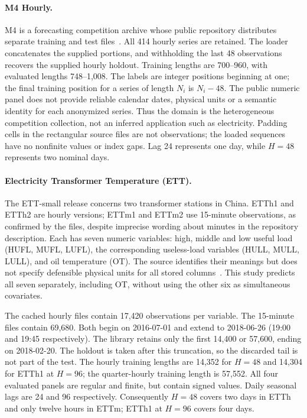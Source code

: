 

\paragraph{M4 Hourly.}
M4 is a forecasting competition archive whose public repository distributes separate training and test files~\cite{m4_data}. All 414 hourly series are retained. The loader concatenates the supplied portions, and withholding the last 48 observations recovers the supplied hourly holdout. Training lengths are 700--960, with evaluated lengths 748--1,008. The labels are integer positions beginning at one; the final training position for a series of length $N_i$ is $N_i-48$. The public numeric panel does not provide reliable calendar dates, physical units or a semantic identity for each anonymized series. Thus the domain is the heterogeneous competition collection, not an inferred application such as electricity. Padding cells in the rectangular source files are not observations; the loaded sequences have no nonfinite values or index gaps. Lag 24 represents one day, while $H=48$ represents two nominal days.

\paragraph{Electricity Transformer Temperature (ETT).}
The ETT-small release concerns two transformer stations in China. ETTh1 and ETTh2 are hourly versions; ETTm1 and ETTm2 use 15-minute observations, as confirmed by the files, despite imprecise wording about minutes in the repository description. Each has seven numeric variables: high, middle and low useful load (HUFL, MUFL, LUFL), the corresponding useless-load variables (HULL, MULL, LULL), and oil temperature (OT). The source identifies their meanings but does not specify defensible physical units for all stored columns~\cite{ett_data}. This study predicts all seven separately, including OT, without using the other six as simultaneous covariates.

The cached hourly files contain 17,420 observations per variable. The 15-minute files contain 69,680. Both begin on 2016-07-01 and extend to 2018-06-26 (19:00 and 19:45 respectively). The library retains only the first 14,400 or 57,600, ending on 2018-02-20. The holdout is taken after this truncation, so the discarded tail is not part of the test. The hourly training lengths are 14,352 for $H=48$ and 14,304 for ETTh1 at $H=96$; the quarter-hourly training length is 57,552. All four evaluated panels are regular and finite, but contain signed values. Daily seasonal lags are 24 and 96 respectively. Consequently $H=48$ covers two days in ETTh and only twelve hours in ETTm; ETTh1 at $H=96$ covers four days.


